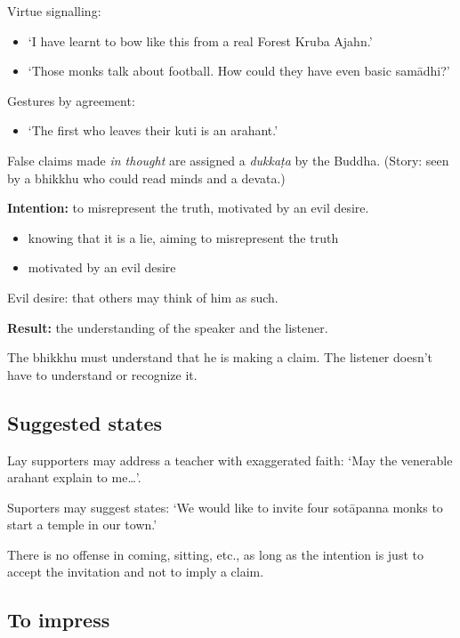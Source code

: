 Virtue signalling:

\begin{itemize}
\tightlist
\item
  `I have learnt to bow like this from a real Forest Kruba Ajahn.'
\item
  `Those monks talk about football. How could they have even basic
  samādhi?'
\end{itemize}

Gestures by agreement:

\begin{itemize}
\tightlist
\item
  `The first who leaves their kuti is an arahant.'
\end{itemize}

False claims made \emph{in thought} are assigned a \emph{dukkaṭa} by the
Buddha. (Story: seen by a bhikkhu who could read minds and a devata.)

\textbf{Intention:} to misrepresent the truth, motivated by an evil
desire.

\begin{itemize}
\tightlist
\item
  knowing that it is a lie, aiming to misrepresent the truth
\item
  motivated by an evil desire
\end{itemize}

Evil desire: that others may think of him as such.

\textbf{Result:} the understanding of the speaker and the listener.

The bhikkhu must understand that he is making a claim. The listener
doesn't have to understand or recognize it.

\subsection{Suggested states}

Lay supporters may address a teacher with exaggerated faith: `May the
venerable arahant explain to me\ldots{}'.

Suporters may suggest states: `We would like to invite four sotāpanna
monks to start a temple in our town.'

There is no offense in coming, sitting, etc., as long as the intention
is just to accept the invitation and not to imply a claim.

\subsection{To impress}

